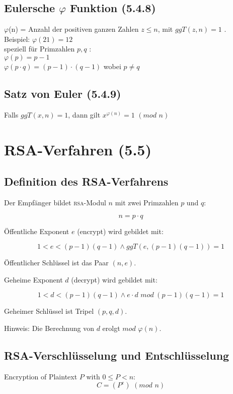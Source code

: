 \subsection{Eulersche $\varphi$ Funktion (5.4.8)}
$\varphi$(n) = Anzahl der positiven ganzen Zahlen $z \le n$, mit $ggT(z,n) = 1$ . \\
Beispiel: $\varphi(21) = 12$ \\
speziell für Primzahlen $p, q$ : \\
$\varphi(p) = p-1$ \\
$\varphi(p \cdot q) = (p-1) \cdot (q-1)$ wobei $p \neq q$ \\

\subsection{Satz von Euler (5.4.9)}
Falls $ggT(x, n) = 1$, dann gilt  $x^{\varphi(n)} = 1 \hspace{4pt} (mod \hspace{4pt} n) $ 

\section{RSA-Verfahren (5.5)}
\subsection{Definition des RSA-Verfahrens}
Der Empfänger bildet \textsc{rsa}-Modul $n$ mit zwei Primzahlen $p$ und $q$:

$$
	n = p \cdot q
$$

Öffentliche Exponent $e$ (encrypt) wird gebildet mit:

$$
	1 < e < (p-1)(q-1) \wedge ggT(e,(p-1)(q-1)) = 1
$$

Öffentlicher Schlüssel ist das Paar $(n,e)$.

Geheime Exponent $d$ (decrypt) wird gebildet mit:

$$
	1 < d < (p-1)(q-1) \wedge e \cdot d \hspace{4pt} mod \hspace{3pt} (p-1)(q-1) = 1
$$

Geheimer Schlüssel ist Tripel $(p,q,d)$.

Hinweis: Die Berechnung von $d$ erolgt $mod \hspace{4pt} \varphi(n)$.

\subsection{RSA-Verschlüsselung und Entschlüsselung}
Encryption of Plaintext $P$ with $0 \le P < n$:
$$ C = (P^e) \hspace{4pt} (mod \hspace{4pt} n)  $$


